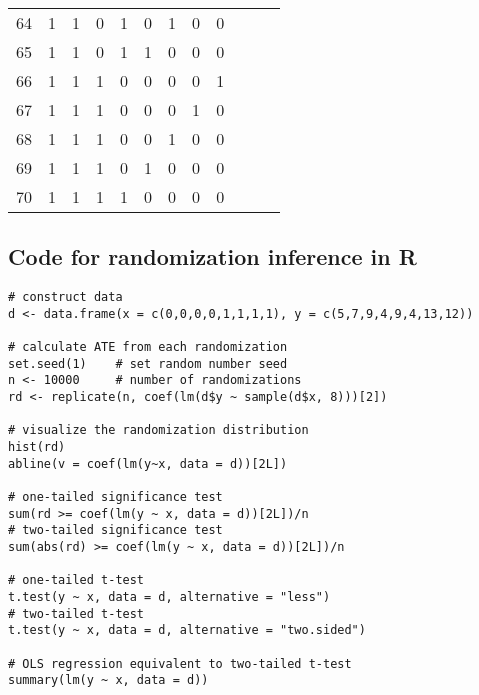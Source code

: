 \documentclass[a4paper,12pt]{article}
\begin{document}
\begin{center}
\begin{longtable}{c|cccccccc|rrr}
64 & 1 & 1 & 0 & 1 & 0 & 1 & 0 & 0 & \\
65 & 1 & 1 & 0 & 1 & 1 & 0 & 0 & 0 & \\ \midrule
66 & 1 & 1 & 1 & 0 & 0 & 0 & 0 & 1 & \\
67 & 1 & 1 & 1 & 0 & 0 & 0 & 1 & 0 & \\
68 & 1 & 1 & 1 & 0 & 0 & 1 & 0 & 0 & \\
69 & 1 & 1 & 1 & 0 & 1 & 0 & 0 & 0 & \\
70 & 1 & 1 & 1 & 1 & 0 & 0 & 0 & 0 & \\ \bottomrule
\end{longtable}
\end{center}

\clearpage

\subsection*{Code for randomization inference in R}

\begin{verbatim}
# construct data
d <- data.frame(x = c(0,0,0,0,1,1,1,1), y = c(5,7,9,4,9,4,13,12))

# calculate ATE from each randomization
set.seed(1)    # set random number seed
n <- 10000     # number of randomizations
rd <- replicate(n, coef(lm(d$y ~ sample(d$x, 8)))[2])

# visualize the randomization distribution
hist(rd)
abline(v = coef(lm(y~x, data = d))[2L])

# one-tailed significance test
sum(rd >= coef(lm(y ~ x, data = d))[2L])/n
# two-tailed significance test
sum(abs(rd) >= coef(lm(y ~ x, data = d))[2L])/n

# one-tailed t-test
t.test(y ~ x, data = d, alternative = "less")
# two-tailed t-test
t.test(y ~ x, data = d, alternative = "two.sided")

# OLS regression equivalent to two-tailed t-test
summary(lm(y ~ x, data = d))
\end{verbatim}
\end{document}
